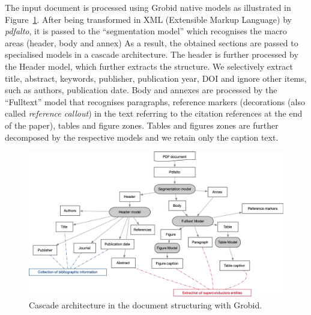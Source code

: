 \documentclass{article}
\begin{document}
The input document is processed using Grobid native models as illustrated in Figure~\ref{fig:grobid-document-processing}. After being transformed in XML (Extensible Markup Language) by \textit{pdfalto}, it is passed to the ``segmentation model'' which recognises the macro areas (header, body and annex)  As a result, the obtained sections are passed to specialised models in a cascade architecture. The header is further processed by the Header model, which further extracts the structure. We selectively extract title, abstract, keywords, publisher, publication year, DOI and ignore other items, such as authors, publication date. 
Body and annexes are processed by the ``Fulltext'' model that recognises paragraphs, reference markers (decorations (also called \textit{reference callout}) in the text referring to the citation references at the end of the paper), tables and figure zones.
Tables and figures zones are further decomposed by the respective models and we retain only the caption text. 

\begin{figure}[ht]
\label{fig:grobid-document-processing}
\includegraphics[width=\textwidth]{grobid-extraction-1}
\caption{Cascade architecture in the document structuring with Grobid.}
\end{figure}
\end{document}
